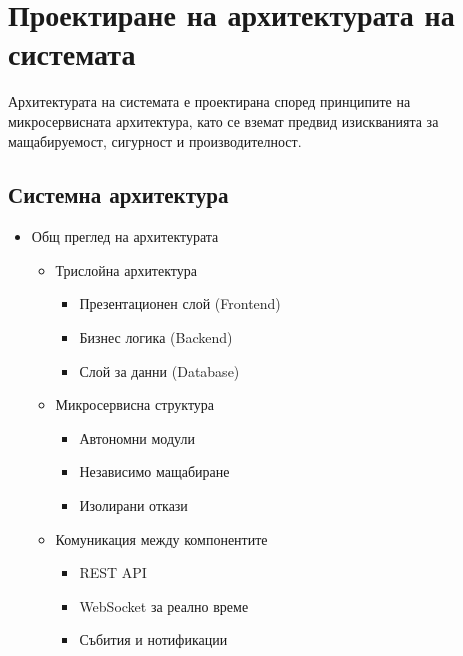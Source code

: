 \documentclass[12pt,a4paper]{article}
\begin{document}
\section{Проектиране на архитектурата на системата}
Архитектурата на системата е проектирана според принципите на микросервисната архитектура, като се вземат предвид изискванията за мащабируемост, сигурност и производителност.

\subsection{Системна архитектура}
\begin{itemize}
    \item Общ преглед на архитектурата
    \begin{itemize}
        \item Трислойна архитектура
        \begin{itemize}
            \item Презентационен слой (Frontend)
            \item Бизнес логика (Backend)
            \item Слой за данни (Database)
        \end{itemize}
        \item Микросервисна структура
        \begin{itemize}
            \item Автономни модули
            \item Независимо мащабиране
            \item Изолирани откази
        \end{itemize}
        \item Комуникация между компонентите
        \begin{itemize}
            \item REST API
            \item WebSocket за реално време
            \item Събития и нотификации
        \end{itemize}
    \end{itemize}
    

\end{itemize}
\end{document}
